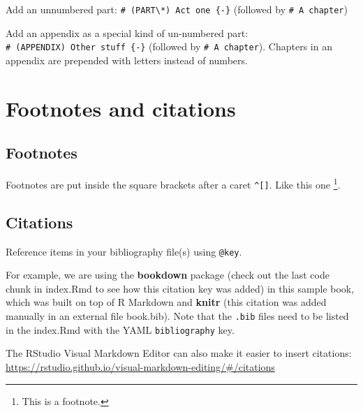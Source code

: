 \documentclass[
]{book}
\begin{document}
Add an unnumbered part: \texttt{\#\ (PART\textbackslash{}*)\ Act\ one\ \{-\}} (followed by \texttt{\#\ A\ chapter})

Add an appendix as a special kind of un-numbered part: \texttt{\#\ (APPENDIX)\ Other\ stuff\ \{-\}} (followed by \texttt{\#\ A\ chapter}). Chapters in an appendix are prepended with letters instead of numbers.

\hypertarget{footnotes-and-citations}{%
\chapter{Footnotes and citations}\label{footnotes-and-citations}}

\hypertarget{footnotes}{%
\section{Footnotes}\label{footnotes}}

Footnotes are put inside the square brackets after a caret \texttt{\^{}{[}{]}}. Like this one \footnote{This is a footnote.}.

\hypertarget{citations}{%
\section{Citations}\label{citations}}

Reference items in your bibliography file(s) using \texttt{@key}.

For example, we are using the \textbf{bookdown} package \citep{R-bookdown} (check out the last code chunk in index.Rmd to see how this citation key was added) in this sample book, which was built on top of R Markdown and \textbf{knitr} \citep{xie2015} (this citation was added manually in an external file book.bib).
Note that the \texttt{.bib} files need to be listed in the index.Rmd with the YAML \texttt{bibliography} key.

The RStudio Visual Markdown Editor can also make it easier to insert citations: \url{https://rstudio.github.io/visual-markdown-editing/\#/citations}

  
\end{document}
